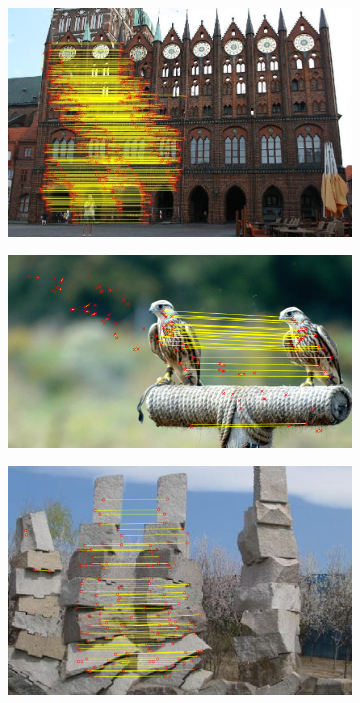 \documentclass[12pt]{article}
\begin{document}
\begin{figure}
\begin{subfigure}{.5\textwidth}
\end{subfigure}%
\begin{subfigure}{.5\textwidth}
  \centering
  \includegraphics[width=.8\linewidth]{../results/extension/box-regular_high.jpg}
\end{subfigure}
\begin{subfigure}{.5\textwidth}
  \centering
  \includegraphics[width=.8\linewidth]{./gfx/falcon.png}
\end{subfigure}%
\begin{subfigure}{.5\textwidth}
  \centering
  \includegraphics[width=.8\linewidth]{./gfx/stones.png}
\end{subfigure}

\end{figure}
\end{document}

